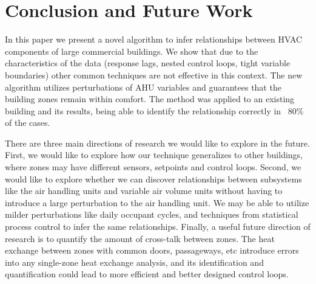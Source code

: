 \section{Conclusion and Future Work}

In this paper we present a novel algorithm to infer relationships between HVAC components of large commercial buildings. We show that due to the characteristics of the data (response lags, nested control loops, tight variable boundaries) other common techniques are not effective in this context. The new algorithm utilizes perturbations of AHU variables and guarantees that the building zones remain within comfort. The method was applied to an existing building and its results, being able to identify the relationship correctly in ~80\% of the cases.

There are three main directions of research we would like to explore in the future. First, we would like to explore how our technique generalizes to other buildings, where zones may have different sensors, setpoints and control loops. Second, we would like to explore whether we can discover relationships between subsystems like the air handling units and variable air volume units without having to introduce a large perturbation to the air handling unit. We may be able to utilize milder perturbations like daily occupant cycles, and techniques from statistical process control to infer the same relationships. Finally, a useful future direction of research is to quantify the amount of cross-talk between zones. The heat exchange between zones with common doors, passageways, etc introduce errors into any single-zone heat exchange analysis, and its identification and quantification could lead to more efficient and better designed control loops. 
